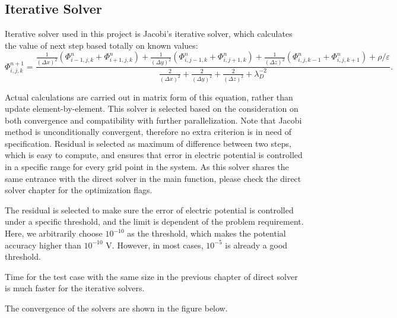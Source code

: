 \documentclass{article}
\begin{document}
\begin{spacing}{1.1}
\subsection{Iterative Solver}

Iterative solver used in this project is Jacobi's iterative solver, which calculates the value of next step based totally on known values:
\[\Phi^{n+1}_{i,j,k} = \frac{\frac{1}{(\Delta x)^2}(\Phi^{n}_{i-1,j,k}+\Phi^{n}_{i+1,j,k})+\frac{1}{(\Delta y)^2}(\Phi^{n}_{i,j-1,k}+\Phi^{n}_{i,j+1,k})+\frac{1}{(\Delta z)^2}(\Phi^{n}_{i,j,k-1}+\Phi^{n}_{i,j,k+1})+\rho/\varepsilon}{\frac{2}{(\Delta x)^2}+\frac{2}{(\Delta y)^2}+\frac{2}{(\Delta z)^2}+\lambda_D^{-2}}.\]

Actual calculations are carried out in matrix form of this equation, rather than update element-by-element. This solver is selected based on the consideration on both convergence and compatibility with further parallelization. Note that Jacobi method is unconditionally convergent, therefore no extra criterion is in need of specification. Residual is selected as maximum of difference between two steps, which is easy to compute, and ensures that error in electric potential is controlled in a specific range for every grid point in the system. As this solver shares the same entrance with the direct solver in the main function, please check the direct solver chapter for the optimization flags.

The residual is selected to make sure the error of electric potential is controlled under a specific threshold, and the limit is dependent of the problem requirement. Here, we arbitrarily choose $10^{-10}$ as the threshold, which makes the potential accuracy higher than $10^{-10}$ V. However, in most cases, $10^{-5}$ is already a good threshold.

Time for the test case with the same size in the previous chapter of direct solver is much faster for the iterative solvers.

The convergence of the solvers are shown in the figure below.


\end{spacing}
\end{document}
